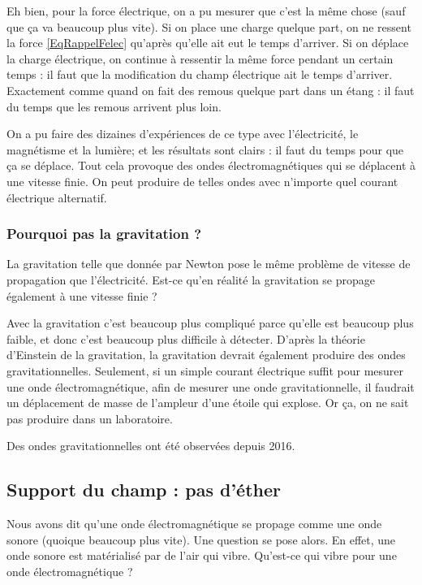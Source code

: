 Eh bien, pour la force électrique, on a pu mesurer que c'est la même chose (sauf que ça va beaucoup plus vite). Si on place une charge quelque part, on ne ressent la force \eqref{EqRappelFelec} qu'après qu'elle ait eut le temps d'arriver. Si on déplace la charge électrique, on continue à ressentir la même force pendant un certain temps : il faut que la modification du champ électrique ait le temps d'arriver. Exactement comme quand on fait des remous quelque part dans un étang : il faut du temps que les remous arrivent plus loin.

On a pu faire des dizaines d'expériences de ce type avec l'électricité, le magnétisme et la lumière; et les résultats sont clairs : il faut du temps pour que ça se déplace. Tout cela provoque des ondes électromagnétiques qui se déplacent à une vitesse finie. On peut produire de telles ondes avec n'importe quel courant électrique alternatif.

\subsubsection{Pourquoi pas la gravitation ?}

La gravitation telle que donnée par Newton pose le même problème de vitesse de propagation que l'électricité. Est-ce qu'en réalité la gravitation se propage également à une vitesse finie ?

Avec la gravitation c'est beaucoup plus compliqué parce qu'elle est beaucoup plus faible, et donc c'est beaucoup plus difficile à détecter. D'après la théorie d'Einstein de la gravitation, la gravitation devrait également produire des ondes gravitationnelles. Seulement, si un simple courant électrique suffit pour mesurer une onde électromagnétique, afin de mesurer une onde gravitationnelle, il faudrait un déplacement de masse de l'ampleur d'une étoile qui explose. Or ça, on ne sait pas produire dans un laboratoire.

Des ondes gravitationnelles ont été observées depuis 2016\cite{BIBooAZZPooQvHWLV}.


\subsection{Support du champ : pas d'éther}

Nous avons dit qu'une onde électromagnétique se propage comme une onde sonore (quoique beaucoup plus vite). Une question se pose alors. En effet, une onde sonore est matérialisé par de l'air qui vibre. Qu'est-ce qui vibre pour une onde électromagnétique ?

